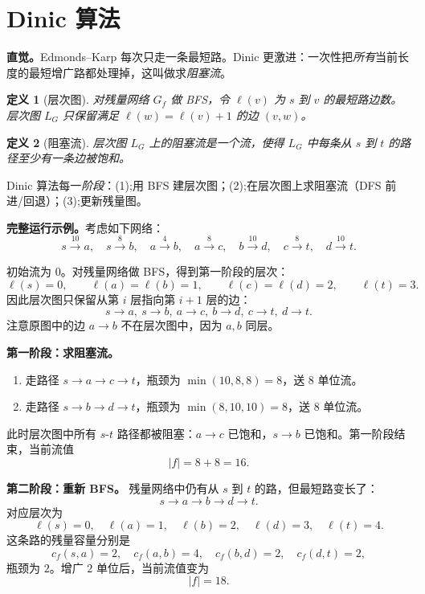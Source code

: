 \documentclass[UTF8,openany,12pt]{ctexbook}
\newtheorem{definition}{定义}[chapter]
\theoremstyle{remark}
\begin{document}
\section{Dinic 算法}

\noindent\textbf{直觉。}Edmonds--Karp 每次只走一条最短路。Dinic 更激进：一次性把\emph{所有}当前长度的最短增广路都处理掉，这叫做求\emph{阻塞流}。

\begin{definition}[层次图]
对残量网络 $G_f$ 做 BFS，令 $\ell(v)$ 为 $s$ 到 $v$ 的最短路边数。
\emph{层次图} $L_G$ 只保留满足 $\ell(w)=\ell(v)+1$ 的边 $(v,w)$。
\end{definition}

\begin{definition}[阻塞流]
层次图 $L_G$ 上的阻塞流是一个流，使得 $L_G$ 中每条从 $s$ 到 $t$ 的路径至少有一条边被饱和。
\end{definition}

\noindent Dinic 算法每一\emph{阶段}：(1);用 BFS 建层次图；(2);在层次图上求阻塞流（DFS 前进/回退）；(3);更新残量图。

\noindent\textbf{完整运行示例。}考虑如下网络：
\[
  s\xrightarrow{10}a,\quad s\xrightarrow{8}b,\quad
  a\xrightarrow{4}b,\quad a\xrightarrow{8}c,\quad
  b\xrightarrow{10}d,\quad c\xrightarrow{8}t,\quad d\xrightarrow{10}t.
\]

\noindent 初始流为 $0$。对残量网络做 BFS，得到第一阶段的层次：
\[
  \ell(s)=0,\qquad \ell(a)=\ell(b)=1,\qquad
  \ell(c)=\ell(d)=2,\qquad \ell(t)=3.
\]
因此层次图只保留从第 $i$ 层指向第 $i+1$ 层的边：
\[
  s\to a,\ s\to b,\ a\to c,\ b\to d,\ c\to t,\ d\to t.
\]
注意原图中的边 $a\to b$ 不在层次图中，因为 $a,b$ 同层。

\medskip
\noindent\textbf{第一阶段：求阻塞流。}
\begin{enumerate}
  \item 走路径 $s\to a\to c\to t$，瓶颈为 $\min(10,8,8)=8$，送 $8$ 单位流。
  \item 走路径 $s\to b\to d\to t$，瓶颈为 $\min(8,10,10)=8$，送 $8$ 单位流。
\end{enumerate}
此时层次图中所有 $s$-$t$ 路径都被阻塞：$a\to c$ 已饱和，$s\to b$ 已饱和。第一阶段结束，当前流值
\[
  |f|=8+8=16.
\]

\medskip
\noindent\textbf{第二阶段：重新 BFS。}
残量网络中仍有从 $s$ 到 $t$ 的路，但最短路变长了：
\[
  s\to a\to b\to d\to t.
\]
对应层次为
\[
  \ell(s)=0,\quad \ell(a)=1,\quad \ell(b)=2,\quad \ell(d)=3,\quad \ell(t)=4.
\]
这条路的残量容量分别是
\[
  c_f(s,a)=2,\quad c_f(a,b)=4,\quad c_f(b,d)=2,\quad c_f(d,t)=2,
\]
瓶颈为 $2$。增广 $2$ 单位后，当前流值变为
\[
  |f|=18.
\]
\end{document}
